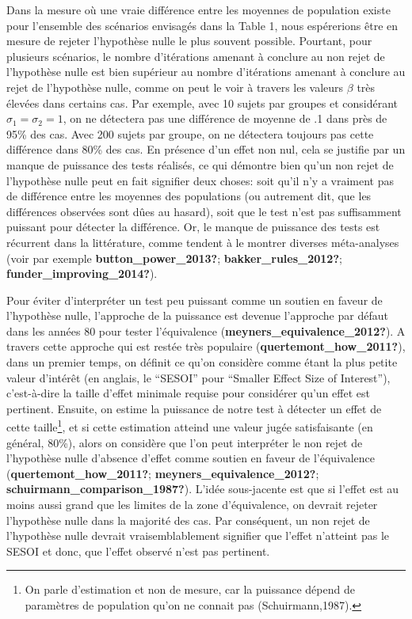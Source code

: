 \documentclass[
  english,
  man]{apa6}
\begin{document}
Dans la mesure où une vraie différence entre les moyennes de population existe pour l'ensemble des scénarios envisagés dans la Table 1, nous espérerions être en mesure de rejeter l'hypothèse nulle le plus souvent possible. Pourtant, pour plusieurs scénarios, le nombre d'itérations amenant à conclure au non rejet de l'hypothèse nulle est bien supérieur au nombre d'itérations amenant à conclure au rejet de l'hypothèse nulle, comme on peut le voir à travers les valeurs \(\beta\) très élevées dans certains cas. Par exemple, avec 10 sujets par groupes et considérant \(\sigma_1=\sigma_2=1\), on ne détectera pas une différence de moyenne de .1 dans près de 95\% des cas. Avec 200 sujets par groupe, on ne détectera toujours pas cette différence dans 80\% des cas. En présence d'un effet non nul, cela se justifie par un manque de puissance des tests réalisés, ce qui démontre bien qu'un non rejet de l'hypothèse nulle peut en fait signifier deux choses: soit qu'il n'y a vraiment pas de différence entre les moyennes des populations (ou autrement dit, que les différences observées sont dûes au hasard), soit que le test n'est pas suffisamment puissant pour détecter la différence. Or, le manque de puissance des tests est récurrent dans la littérature, comme tendent à le montrer diverses méta-analyses (voir par exemple \textbf{button\_power\_2013?}; \textbf{bakker\_rules\_2012?}; \textbf{funder\_improving\_2014?}).

Pour éviter d'interpréter un test peu puissant comme un soutien en faveur de l'hypothèse nulle, l'approche de la puissance est devenue l'approche par défaut dans les années 80 pour tester l'équivalence (\textbf{meyners\_equivalence\_2012?}). A travers cette approche qui est restée très populaire (\textbf{quertemont\_how\_2011?}), dans un premier temps, on définit ce qu'on considère comme étant la plus petite valeur d'intérêt (en anglais, le ``SESOI'' pour ``Smaller Effect Size of Interest''), c'est-à-dire la taille d'effet minimale requise pour considérer qu'un effet est pertinent. Ensuite, on estime la puissance de notre test à détecter un effet de cette taille\footnote{On parle d'estimation et non de mesure, car la puissance dépend de paramètres de population qu'on ne connait pas (Schuirmann,1987).}, et si cette estimation atteind une valeur jugée satisfaisante (en général, 80\%), alors on considère que l'on peut interpréter le non rejet de l'hypothèse nulle d'absence d'effet comme soutien en faveur de l'équivalence (\textbf{quertemont\_how\_2011?}; \textbf{meyners\_equivalence\_2012?}; \textbf{schuirmann\_comparison\_1987?}). L'idée sous-jacente est que si l'effet est au moins aussi grand que les limites de la zone d'équivalence, on devrait rejeter l'hypothèse nulle dans la majorité des cas. Par conséquent, un non rejet de l'hypothèse nulle devrait vraisemblablement signifier que l'effet n'atteint pas le SESOI et donc, que l'effet observé n'est pas pertinent.
\end{document}
